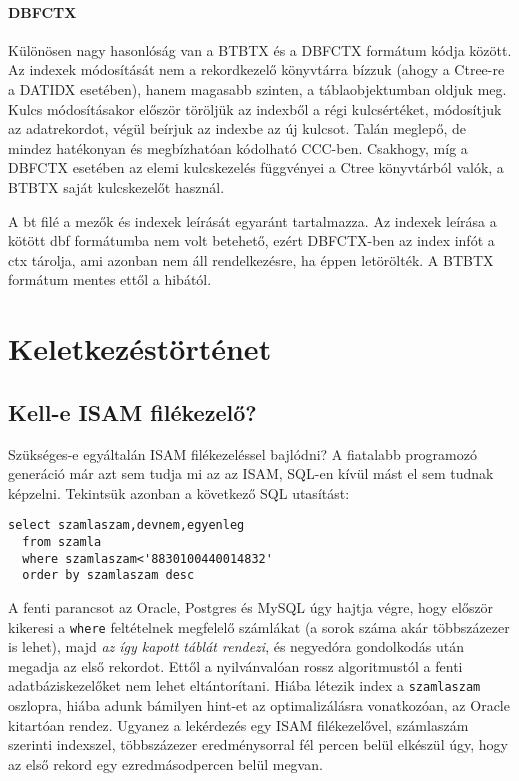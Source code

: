 \paragraph{DBFCTX}

Különösen nagy hasonlóság van a BTBTX és a DBFCTX formátum kódja között.
Az indexek módosítását nem a rekordkezelő könyvtárra bízzuk (ahogy a Ctree-re
a DATIDX esetében), hanem magasabb szinten, a táblaobjektumban oldjuk meg.
Kulcs módosításakor először töröljük az indexből a régi kulcsértéket,
módosítjuk az adatrekordot, végül beírjuk az indexbe az új kulcsot. 
Talán meglepő, de mindez hatékonyan és megbízhatóan kódolható CCC-ben.
Csakhogy, míg a DBFCTX esetében az elemi kulcskezelés függvényei
a Ctree könyvtárból valók, a BTBTX saját kulcskezelőt használ.

A bt filé a mezők és indexek leírását egyaránt tartalmazza.
Az indexek leírása a kötött dbf formátumba nem volt betehető, 
ezért DBFCTX-ben az index infót a ctx tárolja,
ami azonban nem áll rendelkezésre, ha éppen letörölték.
A BTBTX formátum mentes ettől a hibától.


\section{Keletkezéstörténet}

\subsection{Kell-e ISAM filékezelő?}

Szükséges-e egyáltalán ISAM filékezeléssel bajlódni? 
A fiatalabb programozó generáció már azt sem tudja mi az az ISAM, 
SQL-en kívül mást el sem tudnak képzelni. Tekintsük azonban
a következő SQL utasítást:

\begin{verbatim}
select szamlaszam,devnem,egyenleg 
  from szamla 
  where szamlaszam<'8830100440014832' 
  order by szamlaszam desc
\end{verbatim}
 
A fenti parancsot az Oracle, Postgres és MySQL úgy hajtja végre,
hogy először kikeresi a \verb!where! feltételnek megfelelő számlákat
(a sorok száma akár többszázezer is lehet), majd {\it az így kapott táblát 
 rendezi}, és negyedóra gondolkodás után megadja az első rekordot. 
Ettől a nyilvánvalóan rossz  algoritmustól a fenti adatbáziskezelőket 
nem lehet eltántorítani. Hiába létezik index a \verb!szamlaszam! oszlopra, 
hiába adunk bámilyen hint-et az optimalizálásra vonatkozóan, 
az Oracle kitartóan rendez.
Ugyanez a lekérdezés egy ISAM filékezelővel, számlaszám szerinti
indexszel, többszázezer eredménysorral fél percen belül elkészül úgy,
hogy az első rekord egy ezredmásodpercen belül megvan. 

